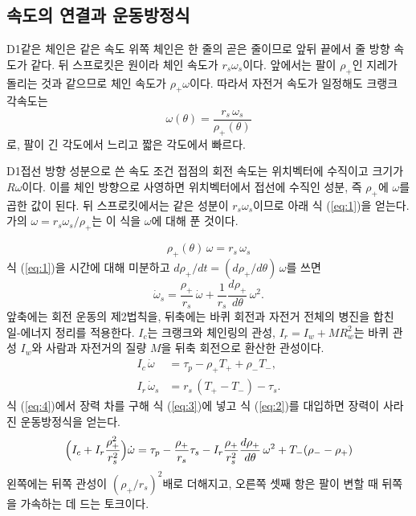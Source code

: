 \subsection{속도의 연결과 운동방정식}
\begin{dupA}{D1}{같은 체인은 같은 속도}
위쪽 체인은 한 줄의 곧은 줄이므로 앞뒤 끝에서 줄 방향 속도가 같다. 뒤 스프로킷은 원이라 체인 속도가 \(r_s\omega_s\)이다. 앞에서는 팔이 \(\rho_+\)인 지레가 돌리는 것과 같으므로 체인 속도가 \(\rho_+\omega\)이다. 따라서 자전거 속도가 일정해도 크랭크 각속도는
\[
\omega(\theta)=\frac{r_s\,\omega_s}{\rho_+(\theta)}
\]
로, 팔이 긴 각도에서 느리고 짧은 각도에서 빠르다.
\end{dupA}
\begin{dupB}{D1}{접선 방향 성분으로 쓴 속도 조건}
접점의 회전 속도는 위치벡터에 수직이고 크기가 \(R\omega\)이다. 이를 체인 방향으로 사영하면 위치벡터에서 접선에 수직인 성분, 즉 \(\rho_+\)에 \(\omega\)를 곱한 값이 된다. 뒤 스프로킷에서는 같은 성분이 \(r_s\omega_s\)이므로 아래 식 (\ref{eq:1})을 얻는다. 가의 \(\omega=r_s\omega_s/\rho_+\)는 이 식을 \(\omega\)에 대해 푼 것이다.
\end{dupB}
\begin{equation}
\rho_+(\theta)\,\omega=r_s\,\omega_s \label{eq:1}
\end{equation}
식 (\ref{eq:1})을 시간에 대해 미분하고 \(d\rho_+/dt=(d\rho_+/d\theta)\,\omega\)를 쓰면
\begin{equation}
\dot\omega_s=\frac{\rho_+}{r_s}\,\dot\omega+\frac{1}{r_s}\frac{d\rho_+}{d\theta}\,\omega^2 . \label{eq:2}
\end{equation}
앞축에는 회전 운동의 제2법칙을, 뒤축에는 바퀴 회전과 자전거 전체의 병진을 합친 일-에너지 정리를 적용한다. \(I_c\)는 크랭크와 체인링의 관성, \(I_r=I_w+MR_w^2\)는 바퀴 관성 \(I_w\)와 사람과 자전거의 질량 \(M\)을 뒤축 회전으로 환산한 관성이다.
\begin{align}
I_c\,\dot\omega&=\tau_p-\rho_+T_++\rho_-T_- , \label{eq:3}\\
I_r\,\dot\omega_s&=r_s\,(T_+-T_-)-\tau_s . \label{eq:4}
\end{align}
식 (\ref{eq:4})에서 장력 차를 구해 식 (\ref{eq:3})에 넣고 식 (\ref{eq:2})를 대입하면 장력이 사라진 운동방정식을 얻는다.
\begin{equation}
\Bigl(I_c+I_r\frac{\rho_+^2}{r_s^2}\Bigr)\dot\omega=\tau_p-\frac{\rho_+}{r_s}\tau_s-I_r\frac{\rho_+}{r_s^2}\frac{d\rho_+}{d\theta}\,\omega^2+T_-(\rho_--\rho_+) \label{eq:5}
\end{equation}
왼쪽에는 뒤쪽 관성이 \((\rho_+/r_s)^2\)배로 더해지고, 오른쪽 셋째 항은 팔이 변할 때 뒤쪽을 가속하는 데 드는 토크이다.

